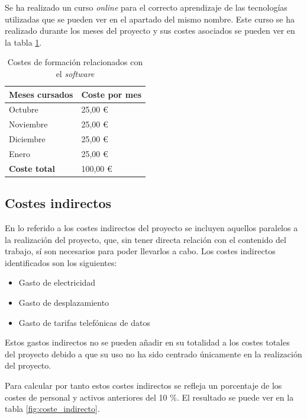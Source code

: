 Se ha realizado un curso \textit{online} para el correcto aprendizaje de las tecnologías utilizadas que se pueden ver en el apartado del mismo nombre. Este curso se ha realizado durante los meses del proyecto y sus costes asociados se pueden ver en la tabla \ref{fig:coste_sw}.


\begin{table}[htpb]
\centering
\begin{tabular}{|l|l|}
\hline
\textbf{Meses cursados} & \textbf{Coste por mes} \\ \hline
Octubre                 & 25,00 \euro                \\ \hline
Noviembre               & 25,00 \euro                \\ \hline
Diciembre               & 25,00 \euro                \\ \hline
Enero                   & 25,00 \euro                \\ \hline
\textbf{Coste total}    & 100,00 \euro               \\ \hline
\end{tabular}
\caption{Costes de formación relacionados con el \textit{software}}
\label{fig:coste_sw}
\end{table}


\subsection{Costes indirectos}
En lo referido a los costes indirectos del proyecto se incluyen aquellos paralelos a la realización del proyecto, que, sin tener directa relación con el contenido del trabajo, sí son necesarios para poder llevarlos a cabo. Los costes indirectos identificados son los siguientes:
\begin{itemize}
\item Gasto de electricidad
\item Gasto de desplazamiento
\item Gasto de tarifas telefónicas de datos
\end{itemize}


Estos gastos indirectos no se pueden añadir en su totalidad a los costes totales del proyecto debido a que su uso no ha sido centrado únicamente en la realización del proyecto.


Para calcular por tanto estos costes indirectos se refleja un porcentaje de los costes de personal y activos anteriores del 10 \%. El resultado se puede ver en la tabla \ref{fig:coste_indirecto}.


